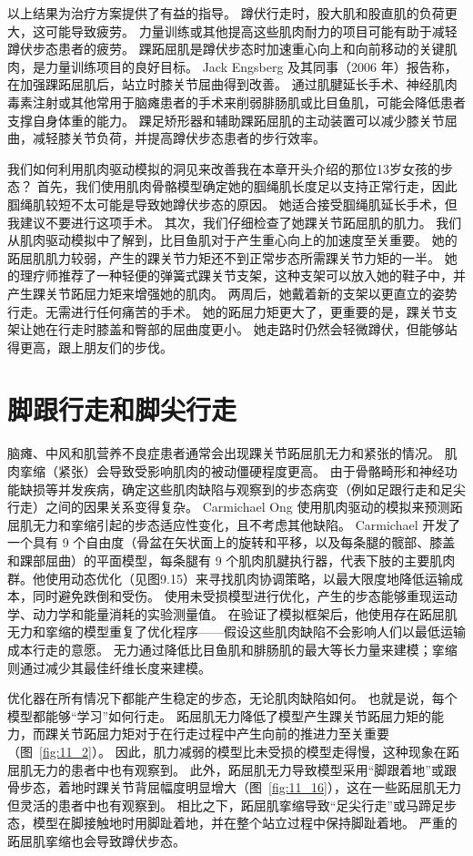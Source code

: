 以上结果为治疗方案提供了有益的指导。
蹲伏行走时，股大肌和股直肌的负荷更大，这可能导致疲劳。
力量训练或其他提高这些肌肉耐力的项目可能有助于减轻蹲伏步态患者的疲劳。
踝跖屈肌是蹲伏步态时加速重心向上和向前移动的关键肌肉，是力量训练项目的良好目标。
Jack Engsberg 及其同事（2006 年）报告称，在加强踝跖屈肌后，站立时膝关节屈曲得到改善。
通过肌腱延长手术、神经肌肉毒素注射或其他常用于脑瘫患者的手术来削弱腓肠肌或比目鱼肌，可能会降低患者支撑自身体重的能力。
踝足矫形器和辅助踝跖屈肌的主动装置可以减少膝关节屈曲，减轻膝关节负荷，并提高蹲伏步态患者的步行效率。


我们如何利用肌肉驱动模拟的洞见来改善我在本章开头介绍的那位13岁女孩的步态？
首先，我们使用肌肉骨骼模型确定她的腘绳肌长度足以支持正常行走，因此腘绳肌较短不太可能是导致她蹲伏步态的原因。
她适合接受腘绳肌延长手术，但我建议不要进行这项手术。
其次，我们仔细检查了她踝关节跖屈肌的肌力。
我们从肌肉驱动模拟中了解到，比目鱼肌对于产生重心向上的加速度至关重要。
她的跖屈肌肌力较弱，产生的踝关节力矩还不到正常步态所需踝关节力矩的一半。
她的理疗师推荐了一种轻便的弹簧式踝关节支架，这种支架可以放入她的鞋子中，并产生踝关节跖屈力矩来增强她的肌肉。
两周后，她戴着新的支架以更直立的姿势行走。无需进行任何痛苦的手术。
她的跖屈力矩更大了，更重要的是，踝关节支架让她在行走时膝盖和臀部的屈曲度更小。
她走路时仍然会轻微蹲伏，但能够站得更高，跟上朋友们的步伐。


\section{脚跟行走和脚尖行走}

脑瘫、中风和肌营养不良症患者通常会出现踝关节跖屈肌无力和紧张的情况。
肌肉挛缩（紧张）会导致受影响肌肉的被动僵硬程度更高。
由于骨骼畸形和神经功能缺损等并发疾病，确定这些肌肉缺陷与观察到的步态病变（例如足跟行走和足尖行走）之间的因果关系变得复杂。
Carmichael Ong 使用肌肉驱动的模拟来预测跖屈肌无力和挛缩引起的步态适应性变化，且不考虑其他缺陷。
Carmichael 开发了一个具有 9 个自由度（骨盆在矢状面上的旋转和平移，以及每条腿的髋部、膝盖和踝部屈曲）的平面模型，每条腿有 9 个肌肉肌腱执行器，代表下肢的主要肌肉群。他使用动态优化（见图9.15）来寻找肌肉协调策略，以最大限度地降低运输成本，同时避免跌倒和受伤。
使用未受损模型进行优化，产生的步态能够重现运动学、动力学和能量消耗的实验测量值。
在验证了模拟框架后，他使用存在跖屈肌无力和挛缩的模型重复了优化程序——假设这些肌肉缺陷不会影响人们以最低运输成本行走的意愿。
无力通过降低比目鱼肌和腓肠肌的最大等长力量来建模；挛缩则通过减少其最佳纤维长度来建模。


优化器在所有情况下都能产生稳定的步态，无论肌肉缺陷如何。
也就是说，每个模型都能够“学习”如何行走。
跖屈肌无力降低了模型产生踝关节跖屈力矩的能力，而踝关节跖屈力矩对于在行走过程中产生向前的推进力至关重要（图~\ref{fig:11_2}）。
因此，肌力减弱的模型比未受损的模型走得慢，这种现象在跖屈肌无力的患者中也有观察到。
此外，跖屈肌无力导致模型采用“脚跟着地”或跟骨步态，着地时踝关节背屈幅度明显增大（图~\ref{fig:11_16}），这在一些跖屈肌无力但灵活的患者中也有观察到。
相比之下，跖屈肌挛缩导致“足尖行走”或马蹄足步态，模型在脚接触地时用脚趾着地，并在整个站立过程中保持脚趾着地。
严重的跖屈肌挛缩也会导致蹲伏步态。


